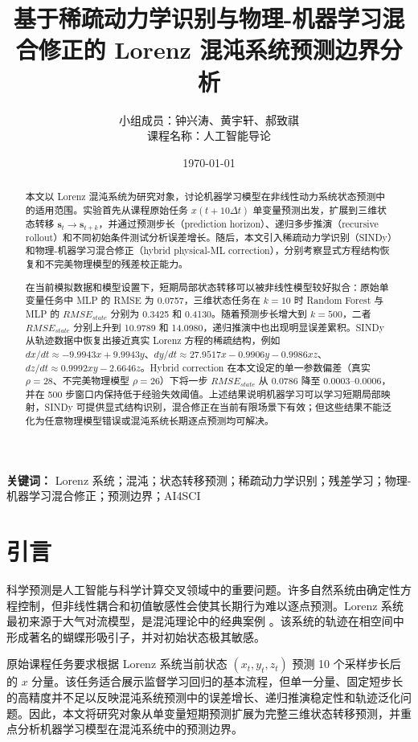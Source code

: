 \documentclass[UTF8,a4paper,12pt]{ctexart}
\title{基于稀疏动力学识别与物理-机器学习混合修正的 Lorenz 混沌系统预测边界分析}
\author{小组成员：钟兴涛、黄宇轩、郝致祺\\课程名称：人工智能导论}
\date{\today}
\begin{document}
\maketitle

\begin{abstract}
本文以 Lorenz 混沌系统为研究对象，讨论机器学习模型在非线性动力系统状态预测中的适用范围。实验首先从课程原始任务 $x(t+10\Delta t)$ 单变量预测出发，扩展到三维状态转移 $\mathbf{s}_t\to\mathbf{s}_{t+k}$，并通过预测步长（prediction horizon）、递归多步推演（recursive rollout）和不同初始条件测试分析误差增长。随后，本文引入稀疏动力学识别（SINDy）和物理-机器学习混合修正（hybrid physical-ML correction），分别考察显式方程结构恢复和不完美物理模型的残差校正能力。

在当前模拟数据和模型设置下，短期局部状态转移可以被非线性模型较好拟合：原始单变量任务中 MLP 的 RMSE 为 0.0757，三维状态任务在 $k=10$ 时 Random Forest 与 MLP 的 $RMSE_{state}$ 分别为 0.3425 和 0.4130。随着预测步长增大到 $k=500$，二者 $RMSE_{state}$ 分别上升到 10.9789 和 14.0980，递归推演中也出现明显误差累积。SINDy 从轨迹数据中恢复出接近真实 Lorenz 方程的稀疏结构，例如 $dx/dt\approx -9.9943x+9.9943y$、$dy/dt\approx27.9517x-0.9906y-0.9986xz$、$dz/dt\approx0.9992xy-2.6646z$。Hybrid correction 在本文设定的单一参数偏差（真实 $\rho=28$、不完美物理模型 $\rho=26$）下将一步 $RMSE_{state}$ 从 0.0786 降至 0.0003--0.0006，并在 500 步窗口内保持低于经验失效阈值。上述结果说明机器学习可以学习短期局部映射，SINDy 可提供显式结构识别，混合修正在当前有限场景下有效；但这些结果不能泛化为任意物理模型错误或混沌系统长期逐点预测均可解决。
\end{abstract}

\noindent\textbf{关键词：} Lorenz 系统；混沌；状态转移预测；稀疏动力学识别；残差学习；物理-机器学习混合修正；预测边界；AI4SCI

\section{引言}

科学预测是人工智能与科学计算交叉领域中的重要问题。许多自然系统由确定性方程控制，但非线性耦合和初值敏感性会使其长期行为难以逐点预测。Lorenz 系统最初来源于大气对流模型，是混沌理论中的经典案例 \cite{lorenz1963}。该系统的轨迹在相空间中形成著名的蝴蝶形吸引子，并对初始状态极其敏感。

原始课程任务要求根据 Lorenz 系统当前状态 $(x_t,y_t,z_t)$ 预测 10 个采样步长后的 $x$ 分量。该任务适合展示监督学习回归的基本流程，但单一分量、固定短步长的高精度并不足以反映混沌系统预测中的误差增长、递归推演稳定性和轨迹泛化问题。因此，本文将研究对象从单变量短期预测扩展为完整三维状态转移预测，并重点分析机器学习模型在混沌系统中的预测边界。
\end{document}
